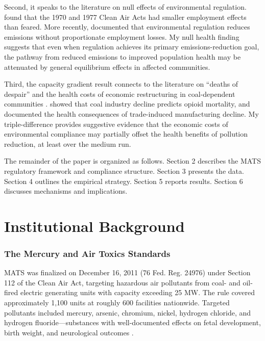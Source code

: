 \documentclass[12pt]{article}
\begin{document}
Second, it speaks to the literature on null effects of environmental regulation. \citet{greenstone2004did} found that the 1970 and 1977 Clean Air Acts had smaller employment effects than feared. More recently, \citet{shapiro2022trade} documented that environmental regulation reduces emissions without proportionate employment losses. My null health finding suggests that even when regulation achieves its primary emissions-reduction goal, the pathway from reduced emissions to improved population health may be attenuated by general equilibrium effects in affected communities.

Third, the capacity gradient result connects to the literature on ``deaths of despair'' and the health costs of economic restructuring in coal-dependent communities \citep{case2015rising, case2020deaths}. \citet{hollingsworth2017opioid} showed that coal industry decline predicts opioid mortality, and \citet{autor2019work} documented the health consequences of trade-induced manufacturing decline. My triple-difference provides suggestive evidence that the economic costs of environmental compliance may partially offset the health benefits of pollution reduction, at least over the medium run.

The remainder of the paper is organized as follows. Section 2 describes the MATS regulatory framework and compliance structure. Section 3 presents the data. Section 4 outlines the empirical strategy. Section 5 reports results. Section 6 discusses mechanisms and implications.


\section{Institutional Background}

\subsubsection*{The Mercury and Air Toxics Standards} MATS was finalized on December 16, 2011 (76 Fed. Reg. 24976) under Section 112 of the Clean Air Act, targeting hazardous air pollutants from coal- and oil-fired electric generating units with capacity exceeding 25 MW. The rule covered approximately 1,100 units at roughly 600 facilities nationwide. Targeted pollutants included mercury, arsenic, chromium, nickel, hydrogen chloride, and hydrogen fluoride---substances with well-documented effects on fetal development, birth weight, and neurological outcomes \citep{trasande2005public, grandjean2014neurobehavioural}.
\end{document}
